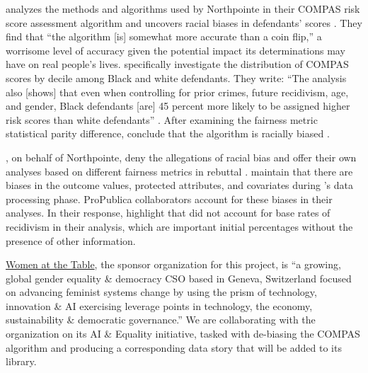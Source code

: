 \documentclass[water,article,submit,moreauthors,pdftex]{mdpi}
\begin{document}
\citet{angwin2016machine} analyzes the methods and algorithms used by
Northpointe in their COMPAS risk score assessment algorithm and uncovers
racial biases in defendants' scores \citep{angwin2016machine}. They find
that ``the algorithm {[}is{]} somewhat more accurate than a coin flip,''
a worrisome level of accuracy given the potential impact its
determinations may have on real people's lives.
\citet{angwin2016machine} specifically investigate the distribution of
COMPAS scores by decile among Black and white defendants. They write:
``The analysis also {[}shows{]} that even when controlling for prior
crimes, future recidivism, age, and gender, Black defendants {[}are{]}
45 percent more likely to be assigned higher risk scores than white
defendants'' \citep{larson2016we}. After examining the fairness metric
statistical parity difference, \citet{angwin2016machine} conclude that
the algorithm is racially biased \citep{larson2016we}.

\citet{equivant_response_2016}, on behalf of Northpointe, deny the
allegations of racial bias and offer their own analyses based on
different fairness metrics in rebuttal \citep{equivant_response_2016}.
\citet{angwin2016machine} maintain that there are biases in the outcome
values, protected attributes, and covariates during
\citet{equivant_response_2016}'s data processing phase. ProPublica
collaborators \citet{larson2016we} account for these biases in their
analyses. In their response, \citet{equivant_response_2016} highlight
that \citet{angwin2016machine} did not account for base rates of
recidivism in their analysis, which are important initial percentages
without the presence of other information.

\href{https://www.womenatthetable.net/}{Women at the Table}, the sponsor
organization for this project, is ``a growing, global gender equality \&
democracy CSO based in Geneva, Switzerland focused on advancing feminist
systems change by using the prism of technology, innovation \& AI
exercising leverage points in technology, the economy, sustainability \&
democratic governance.'' We are collaborating with the organization on
its AI \& Equality \citep{noauthor_ai_nodate} initiative, tasked with
de-biasing the COMPAS algorithm \citep{aif360-oct-2018} and producing a
corresponding data story that will be added to its library.
\end{document}
